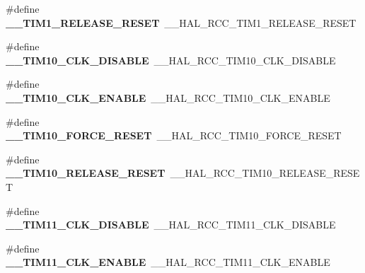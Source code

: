 \begin{DoxyCompactItemize}
\item 
\#define {\bfseries \+\_\+\+\_\+\+T\+I\+M1\+\_\+\+R\+E\+L\+E\+A\+S\+E\+\_\+\+R\+E\+S\+ET}~\+\_\+\+\_\+\+H\+A\+L\+\_\+\+R\+C\+C\+\_\+\+T\+I\+M1\+\_\+\+R\+E\+L\+E\+A\+S\+E\+\_\+\+R\+E\+S\+ET\hypertarget{group___h_a_l___r_c_c___aliased_ga11d22b1ab7d4d7b9e21f70feca19d595}{}\label{group___h_a_l___r_c_c___aliased_ga11d22b1ab7d4d7b9e21f70feca19d595}

\item 
\#define {\bfseries \+\_\+\+\_\+\+T\+I\+M10\+\_\+\+C\+L\+K\+\_\+\+D\+I\+S\+A\+B\+LE}~\+\_\+\+\_\+\+H\+A\+L\+\_\+\+R\+C\+C\+\_\+\+T\+I\+M10\+\_\+\+C\+L\+K\+\_\+\+D\+I\+S\+A\+B\+LE\hypertarget{group___h_a_l___r_c_c___aliased_ga6015db503657bee4d141974992681af4}{}\label{group___h_a_l___r_c_c___aliased_ga6015db503657bee4d141974992681af4}

\item 
\#define {\bfseries \+\_\+\+\_\+\+T\+I\+M10\+\_\+\+C\+L\+K\+\_\+\+E\+N\+A\+B\+LE}~\+\_\+\+\_\+\+H\+A\+L\+\_\+\+R\+C\+C\+\_\+\+T\+I\+M10\+\_\+\+C\+L\+K\+\_\+\+E\+N\+A\+B\+LE\hypertarget{group___h_a_l___r_c_c___aliased_gaaede2703ebcc0edcfe2508364b465ba2}{}\label{group___h_a_l___r_c_c___aliased_gaaede2703ebcc0edcfe2508364b465ba2}

\item 
\#define {\bfseries \+\_\+\+\_\+\+T\+I\+M10\+\_\+\+F\+O\+R\+C\+E\+\_\+\+R\+E\+S\+ET}~\+\_\+\+\_\+\+H\+A\+L\+\_\+\+R\+C\+C\+\_\+\+T\+I\+M10\+\_\+\+F\+O\+R\+C\+E\+\_\+\+R\+E\+S\+ET\hypertarget{group___h_a_l___r_c_c___aliased_ga51608836d363e8f56bcd43ef9846cec4}{}\label{group___h_a_l___r_c_c___aliased_ga51608836d363e8f56bcd43ef9846cec4}

\item 
\#define {\bfseries \+\_\+\+\_\+\+T\+I\+M10\+\_\+\+R\+E\+L\+E\+A\+S\+E\+\_\+\+R\+E\+S\+ET}~\+\_\+\+\_\+\+H\+A\+L\+\_\+\+R\+C\+C\+\_\+\+T\+I\+M10\+\_\+\+R\+E\+L\+E\+A\+S\+E\+\_\+\+R\+E\+S\+ET\hypertarget{group___h_a_l___r_c_c___aliased_ga69408398d8d314c1ad20868dc155bd1a}{}\label{group___h_a_l___r_c_c___aliased_ga69408398d8d314c1ad20868dc155bd1a}

\item 
\#define {\bfseries \+\_\+\+\_\+\+T\+I\+M11\+\_\+\+C\+L\+K\+\_\+\+D\+I\+S\+A\+B\+LE}~\+\_\+\+\_\+\+H\+A\+L\+\_\+\+R\+C\+C\+\_\+\+T\+I\+M11\+\_\+\+C\+L\+K\+\_\+\+D\+I\+S\+A\+B\+LE\hypertarget{group___h_a_l___r_c_c___aliased_ga976ce9e8e4584c22a293cac41a8c681a}{}\label{group___h_a_l___r_c_c___aliased_ga976ce9e8e4584c22a293cac41a8c681a}

\item 
\#define {\bfseries \+\_\+\+\_\+\+T\+I\+M11\+\_\+\+C\+L\+K\+\_\+\+E\+N\+A\+B\+LE}~\+\_\+\+\_\+\+H\+A\+L\+\_\+\+R\+C\+C\+\_\+\+T\+I\+M11\+\_\+\+C\+L\+K\+\_\+\+E\+N\+A\+B\+LE\hypertarget{group___h_a_l___r_c_c___aliased_ga6cc8eb068efb87a58f7e4ed1c052bda6}{}\label{group___h_a_l___r_c_c___aliased_ga6cc8eb068efb87a58f7e4ed1c052bda6}


\end{DoxyCompactItemize}
